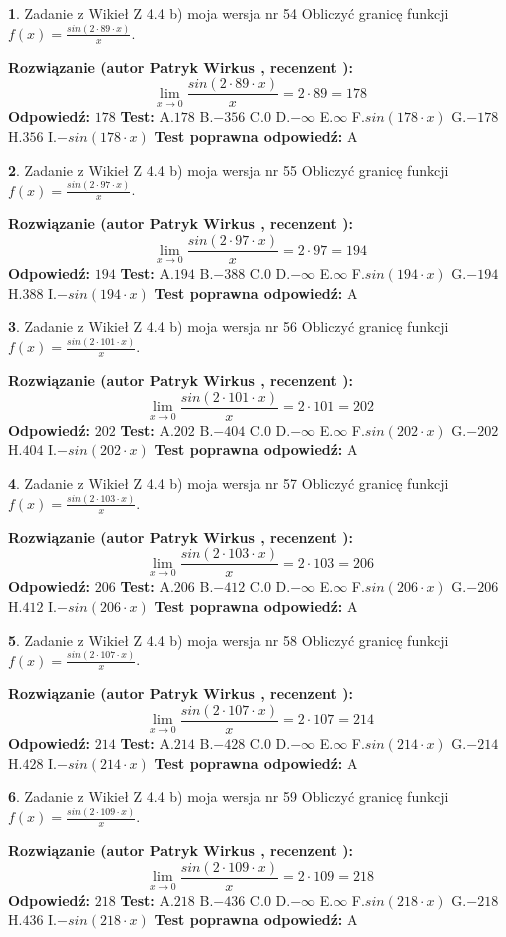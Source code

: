 \documentclass[12pt, a4paper]{article}
\theoremstyle{definition} %
\newtheorem{zad}{}
\newcommand{\zadStart}[1]{\begin{zad}#1\newline}
\newcommand{\zadStop}{\end{zad}}
\newcommand{\rozwStart}[2]{\noindent \textbf{Rozwiązanie (autor #1 , recenzent #2): }\newline}
\newcommand{\rozwStop}{\newline}
\newcommand{\odpStart}{\noindent \textbf{Odpowiedź:}\newline}
\newcommand{\odpStop}{\newline}
\newcommand{\testStart}{\noindent \textbf{Test:}\newline}
\newcommand{\testStop}{\newline}
\newcommand{\kluczStart}{\noindent \textbf{Test poprawna odpowiedź:}\newline}
\newcommand{\kluczStop}{\newline}
\begin{document}
\zadStart{Zadanie z Wikieł Z 4.4 b) moja wersja nr 54}
Obliczyć granicę funkcji $f(x)=\frac{sin(2 \cdot89\cdot x)}{x}$.
\zadStop
\rozwStart{Patryk Wirkus}{}
$$\lim\limits_{x\to 0}\frac{sin(2 \cdot 89\cdot x)}{x}=
2 \cdot 89 = 178$$
\rozwStop
\odpStart
$178$
\odpStop
\testStart
A.$178$
B.$-356$
C.$0$
D.$-\infty$
E.$\infty$
F.$sin(178\cdot x)$
G.$-178$
H.$356$
I.$-sin(178\cdot x)$
\testStop
\kluczStart
A
\kluczStop



\zadStart{Zadanie z Wikieł Z 4.4 b) moja wersja nr 55}
Obliczyć granicę funkcji $f(x)=\frac{sin(2 \cdot97\cdot x)}{x}$.
\zadStop
\rozwStart{Patryk Wirkus}{}
$$\lim\limits_{x\to 0}\frac{sin(2 \cdot 97\cdot x)}{x}=
2 \cdot 97 = 194$$
\rozwStop
\odpStart
$194$
\odpStop
\testStart
A.$194$
B.$-388$
C.$0$
D.$-\infty$
E.$\infty$
F.$sin(194\cdot x)$
G.$-194$
H.$388$
I.$-sin(194\cdot x)$
\testStop
\kluczStart
A
\kluczStop



\zadStart{Zadanie z Wikieł Z 4.4 b) moja wersja nr 56}
Obliczyć granicę funkcji $f(x)=\frac{sin(2 \cdot101\cdot x)}{x}$.
\zadStop
\rozwStart{Patryk Wirkus}{}
$$\lim\limits_{x\to 0}\frac{sin(2 \cdot 101\cdot x)}{x}=
2 \cdot 101 = 202$$
\rozwStop
\odpStart
$202$
\odpStop
\testStart
A.$202$
B.$-404$
C.$0$
D.$-\infty$
E.$\infty$
F.$sin(202\cdot x)$
G.$-202$
H.$404$
I.$-sin(202\cdot x)$
\testStop
\kluczStart
A
\kluczStop



\zadStart{Zadanie z Wikieł Z 4.4 b) moja wersja nr 57}
Obliczyć granicę funkcji $f(x)=\frac{sin(2 \cdot103\cdot x)}{x}$.
\zadStop
\rozwStart{Patryk Wirkus}{}
$$\lim\limits_{x\to 0}\frac{sin(2 \cdot 103\cdot x)}{x}=
2 \cdot 103 = 206$$
\rozwStop
\odpStart
$206$
\odpStop
\testStart
A.$206$
B.$-412$
C.$0$
D.$-\infty$
E.$\infty$
F.$sin(206\cdot x)$
G.$-206$
H.$412$
I.$-sin(206\cdot x)$
\testStop
\kluczStart
A
\kluczStop



\zadStart{Zadanie z Wikieł Z 4.4 b) moja wersja nr 58}
Obliczyć granicę funkcji $f(x)=\frac{sin(2 \cdot107\cdot x)}{x}$.
\zadStop
\rozwStart{Patryk Wirkus}{}
$$\lim\limits_{x\to 0}\frac{sin(2 \cdot 107\cdot x)}{x}=
2 \cdot 107 = 214$$
\rozwStop
\odpStart
$214$
\odpStop
\testStart
A.$214$
B.$-428$
C.$0$
D.$-\infty$
E.$\infty$
F.$sin(214\cdot x)$
G.$-214$
H.$428$
I.$-sin(214\cdot x)$
\testStop
\kluczStart
A
\kluczStop



\zadStart{Zadanie z Wikieł Z 4.4 b) moja wersja nr 59}
Obliczyć granicę funkcji $f(x)=\frac{sin(2 \cdot109\cdot x)}{x}$.
\zadStop
\rozwStart{Patryk Wirkus}{}
$$\lim\limits_{x\to 0}\frac{sin(2 \cdot 109\cdot x)}{x}=
2 \cdot 109 = 218$$
\rozwStop
\odpStart
$218$
\odpStop
\testStart
A.$218$
B.$-436$
C.$0$
D.$-\infty$
E.$\infty$
F.$sin(218\cdot x)$
G.$-218$
H.$436$
I.$-sin(218\cdot x)$
\testStop
\kluczStart
A
\kluczStop
\end{document}
